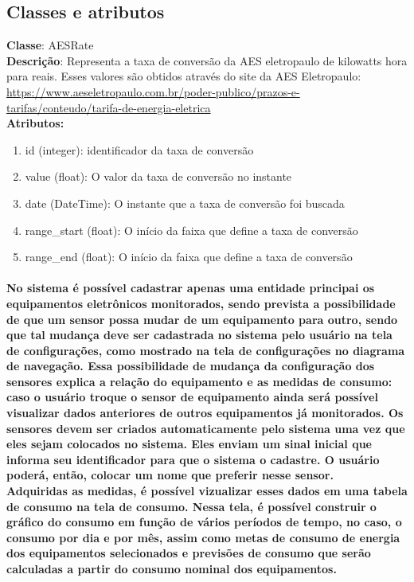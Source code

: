 \subsection{Classes e atributos}
	\textbf{Classe}: AESRate\\
	\textbf{Descrição}: Representa a taxa de conversão da AES eletropaulo de kilowatts hora para reais. Esses valores são obtidos através do site da AES Eletropaulo: \url{https://www.aeseletropaulo.com.br/poder-publico/prazos-e-tarifas/conteudo/tarifa-de-energia-eletrica}\\
	\textbf{Atributos:}
\begin{enumerate}
	\item id (integer): identificador da taxa de conversão
	\item value (float): O valor da taxa de conversão no instante
	\item date (DateTime): O instante que a taxa de conversão foi buscada
	\item range\_start (float): O início da faixa que define a taxa de conversão
    \item range\_end (float): O início da faixa que define a taxa de conversão
\end{enumerate}

\paragraph{No sistema é possível cadastrar apenas uma entidade principai os equipamentos eletrônicos monitorados, sendo prevista a possibilidade de que um sensor possa mudar de um equipamento para outro, sendo que tal mudança deve ser cadastrada no sistema pelo  usuário na tela de configurações, como mostrado na tela de configurações no diagrama de navegação.  Essa possibilidade de mudança da configuração dos sensores explica a relação do equipamento e as medidas de consumo: caso o usuário troque o sensor de equipamento ainda será possível visualizar dados anteriores de outros equipamentos já monitorados.
Os sensores devem ser criados automaticamente pelo sistema uma vez que eles sejam colocados no sistema. Eles enviam um sinal inicial que informa seu identificador para que o sistema o cadastre. O usuário poderá, então, colocar um nome que preferir nesse sensor.\\
Adquiridas as medidas, é possível vizualizar esses dados em uma tabela de consumo na tela de consumo. Nessa tela, é possível construir o gráfico do consumo em função de vários períodos de tempo, no caso, o consumo por dia e por mês, assim como metas de consumo de energia dos equipamentos selecionados e previsões de consumo que serão calculadas a partir do consumo nominal dos equipamentos.
}

